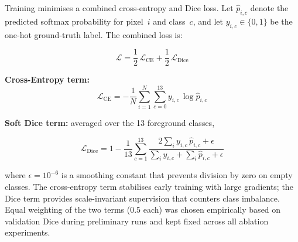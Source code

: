 Training minimises a combined cross-entropy and Dice loss. Let $\hat{p}_{i,c}$ denote the
predicted softmax probability for pixel~$i$ and class~$c$, and let $y_{i,c} \in \{0, 1\}$
be the one-hot ground-truth label. The combined loss is:

\begin{equation}
  \mathcal{L} = \frac{1}{2}\,\mathcal{L}_{\mathrm{CE}} + \frac{1}{2}\,\mathcal{L}_{\mathrm{Dice}}
  \label{eq:combined_loss}
\end{equation}

\noindent\textbf{Cross-Entropy term:}
\begin{equation}
  \mathcal{L}_{\mathrm{CE}} = -\frac{1}{N}\sum_{i=1}^{N}\sum_{c=0}^{13}
  y_{i,c}\,\log\hat{p}_{i,c}
\end{equation}

\noindent\textbf{Soft Dice term:} averaged over the 13 foreground classes,

\begin{equation}
  \mathcal{L}_{\mathrm{Dice}} = 1 - \frac{1}{13}\sum_{c=1}^{13}
  \frac{2\sum_i y_{i,c}\,\hat{p}_{i,c} + \epsilon}
       {\sum_i y_{i,c} + \sum_i \hat{p}_{i,c} + \epsilon}
\end{equation}

where $\epsilon = 10^{-6}$ is a smoothing constant that prevents division by zero on empty
classes. The cross-entropy term stabilises early training with large gradients; the Dice term
provides scale-invariant supervision that counters class imbalance. Equal weighting of the two
terms (0.5 each) was chosen empirically based on validation Dice during preliminary runs and
kept fixed across all ablation experiments.
